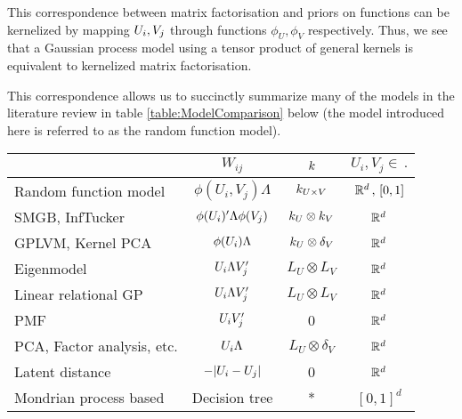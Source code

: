 This correspondence between matrix factorisation and priors on functions can be kernelized by mapping $U_i, V_j$ through functions $\phi_U, \phi_V$ respectively.
Thus, we see that a Gaussian process model using a tensor product of general kernels is equivalent to kernelized matrix factorisation.

This correspondence allows us to succinctly summarize many of the models in the literature review in table \ref{table:ModelComparison} below (the model introduced here is referred to as the random function model).

\begin{table}[h]
  \centering
  \begin{tabular}{l|ccc}%
    & $W_{ij}$ & $k$ & $U_i, V_j \in \, .$ \\%
    \midrule
    Random function model & $\phi(U_i, V_j)\Lambda$ & $k_{U\times V}$ & $\mathbb{R}^d \, , \, [0,1]$\\%
    SMGB, InfTucker & $\phi(U_i)'\Lambda\phi(V_j)$ & $k_U \otimes k_V$ & $\mathbb{R}^d$\\%
    GPLVM, Kernel PCA & $\phi(U_i)\Lambda$ & $k_U \otimes \delta_V$ & $\mathbb{R}^d$ \\%
    Eigenmodel & $U_i\Lambda V_j'$ & $L_U \otimes L_V$ & $\mathbb{R}^d$ \\%
    Linear relational GP & $U_i\Lambda V_j'$ & $L_U \otimes L_V$ & $\mathbb{R}^d$ \\%
    PMF & $U_i V_j'$ & 0 & $\mathbb{R}^d$ \\%
    PCA, Factor analysis, etc. & $U_i\Lambda$ & $L_U \otimes \delta_V$ & $\mathbb{R}^d$ \\%
    Latent distance & $-|U_i - U_j|$ & 0 & $\mathbb{R}^d$ \\%
    Mondrian process based & Decision tree & * & $[0, 1]^d$ \\%

\end{tabular}
\end{table}
